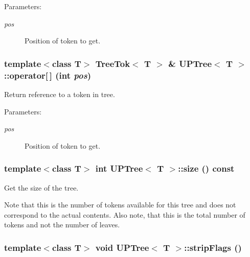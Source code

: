 \begin{Desc}
\item[Parameters:]
\begin{description}
\item[{\em pos}]Position of token to get. \end{description}
\end{Desc}
\subsubsection{\setlength{\rightskip}{0pt plus 5cm}template$<$class T$>$ {\bf Tree\-Tok}$<$ T $>$ \& {\bf UPTree}$<$ T $>$::operator[$\,$] (int {\em pos})\hspace{0.3cm}{\tt  [inline]}}\label{structUPTree_a0}


Return reference to a token in tree. 

\begin{Desc}
\item[Parameters:]
\begin{description}
\item[{\em pos}]Position of token to get. \end{description}
\end{Desc}
\subsubsection{\setlength{\rightskip}{0pt plus 5cm}template$<$class T$>$ int {\bf UPTree}$<$ T $>$::size () const\hspace{0.3cm}{\tt  [inline]}}\label{structUPTree_a4}


Get the size of the tree. 

Note that this is the number of tokens available for this tree and does not correspond to the actual contents. Also note, that this is the total number of tokens and not the number of leaves. 
\subsubsection{\setlength{\rightskip}{0pt plus 5cm}template$<$class T$>$ void {\bf UPTree}$<$ T $>$::strip\-Flags ()\hspace{0.3cm}{\tt  [inline]}}\label{structUPTree_a3}


